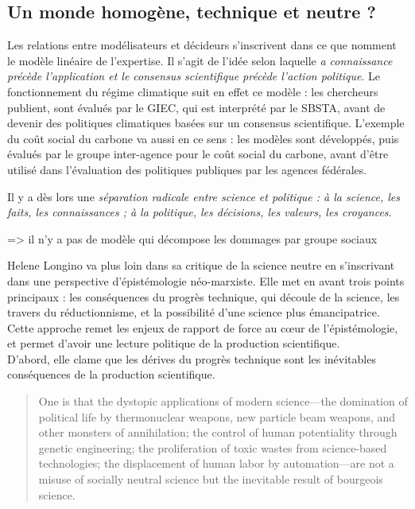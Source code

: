\subsection{Un monde homogène, technique et neutre ?}

Les relations entre modélisateurs et décideurs s'inscrivent dans ce que \cite{aykut_gouverner_nodate} nomment le modèle linéaire de l'expertise. Il s'agit de l'idée selon laquelle \emph{a connaissance précède l’application et le consensus scientifique précède l’action politique}. Le fonctionnement du régime climatique suit en effet ce modèle : les chercheurs publient, sont évalués par le GIEC, qui est interprété par le SBSTA, avant de devenir des politiques climatiques basées sur un consensus scientifique. L'exemple du coût social du carbone va aussi en ce sens : les modèles sont développés, puis évalués par le groupe inter-agence pour le coût social du carbone, avant d'être utilisé dans l'évaluation des politiques publiques par les agences fédérales. 

Il y a dès lors une \emph{séparation radicale entre science et politique : à la science, les faits, les connaissances ; à la politique, les décisions, les valeurs, les croyances}. 






=> il n'y a pas de modèle qui décompose les dommages par groupe sociaux

Helene Longino va plus loin dans sa critique de la science neutre en s'inscrivant dans une perspective d'épistémologie néo-marxiste. Elle met en avant trois points principaux : les conséquences du progrès technique, qui découle de la science, les travers du réductionnisme, et la possibilité d'une science plus émancipatrice. Cette approche remet les enjeux de rapport de force au cœur de l'épistémologie, et permet d'avoir une lecture politique de la production scientifique. \\

D'abord, elle clame que les dérives du progrès technique sont les inévitables conséquences de la production scientifique. 

\begin{quote}
    One is that the dystopic applications of modern science—the domination of political life by thermonuclear weapons, new particle beam weapons, and other monsters of annihilation; the control of human potentiality through genetic engineering; the proliferation of toxic wastes from science-based technologies; the displacement of human labor by automation—are not a misuse of socially neutral science but the inevitable result of bourgeois science.
\end{quote}

